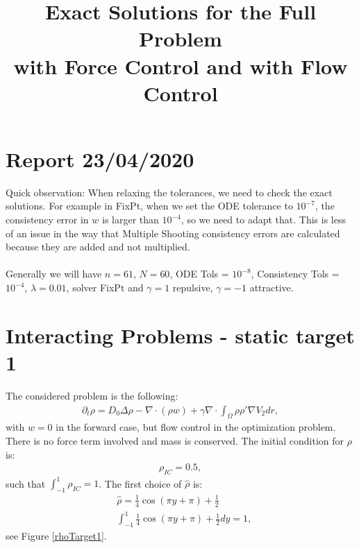 \documentclass[11pt, a4paper]{article}
\title{Exact Solutions for the Full Problem \\with Force Control and with Flow Control}
\date{}
\theoremstyle{definition}
\begin{document}
\section*{Report 23/04/2020}
Quick observation: When relaxing the tolerances, we need to check the exact solutions. For example in FixPt, when we set the ODE tolerance to $10^{-7}$, the consistency error in $w$ is larger than $10^{-4}$, so we need to adapt that. This is less of an issue in the way that Multiple Shooting consistency errors are calculated because they are added and not multiplied.
\\
\\
Generally we will have $n=61$, $N=60$, ODE Tols = $10^{-8}$, Consistency Tols = $10^{-4}$, $\lambda = 0.01$, solver FixPt and $\gamma = 1$ repulsive, $\gamma = -1$ attractive.
\section{Interacting Problems - static target 1}
The considered problem is the following:
\begin{align*}
\partial_t \rho = D_0\Delta \rho - \nabla \cdot (\rho w) + \gamma \nabla \cdot \int_\Omega \rho \rho' \nabla V_2 dr,
\end{align*}
with $w =0$ in the forward case, but flow control in the optimization problem. There is no force term involved and mass is conserved.
The initial condition for $\rho$ is:
\begin{align*}
\rho_{IC} = 0.5,
\end{align*}
such that $\int_{-1}^{1}\rho_{IC} = 1$.
The first choice of $\hat \rho$ is:
\begin{align*}
&\hat \rho = \frac{1}{4}\cos(\pi y +\pi) + \frac{1}{2}\\
&\int_{-1}^{1}\frac{1}{4}\cos(\pi y + \pi) + \frac{1}{2}dy =1,
\end{align*}
see Figure \ref{rhoTarget1}.
\end{document}
